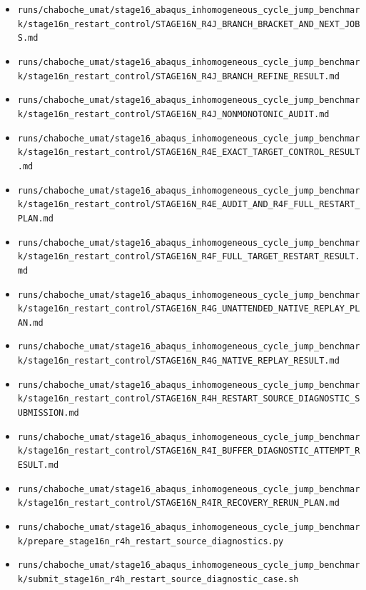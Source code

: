 \documentclass[11pt,a4paper]{article}
\newcommand{\code}[1]{\texttt{#1}}
\begin{document}
\begin{itemize}
  \item \code{runs/chaboche\_umat/stage16\_abaqus\_inhomogeneous\_cycle\_jump\_benchmark/stage16n\_restart\_control/STAGE16N\_R4J\_BRANCH\_BRACKET\_AND\_NEXT\_JOBS.md}
  \item \code{runs/chaboche\_umat/stage16\_abaqus\_inhomogeneous\_cycle\_jump\_benchmark/stage16n\_restart\_control/STAGE16N\_R4J\_BRANCH\_REFINE\_RESULT.md}
  \item \code{runs/chaboche\_umat/stage16\_abaqus\_inhomogeneous\_cycle\_jump\_benchmark/stage16n\_restart\_control/STAGE16N\_R4J\_NONMONOTONIC\_AUDIT.md}
  \item \code{runs/chaboche\_umat/stage16\_abaqus\_inhomogeneous\_cycle\_jump\_benchmark/stage16n\_restart\_control/STAGE16N\_R4E\_EXACT\_TARGET\_CONTROL\_RESULT.md}
  \item \code{runs/chaboche\_umat/stage16\_abaqus\_inhomogeneous\_cycle\_jump\_benchmark/stage16n\_restart\_control/STAGE16N\_R4E\_AUDIT\_AND\_R4F\_FULL\_RESTART\_PLAN.md}
  \item \code{runs/chaboche\_umat/stage16\_abaqus\_inhomogeneous\_cycle\_jump\_benchmark/stage16n\_restart\_control/STAGE16N\_R4F\_FULL\_TARGET\_RESTART\_RESULT.md}
  \item \code{runs/chaboche\_umat/stage16\_abaqus\_inhomogeneous\_cycle\_jump\_benchmark/stage16n\_restart\_control/STAGE16N\_R4G\_UNATTENDED\_NATIVE\_REPLAY\_PLAN.md}
  \item \code{runs/chaboche\_umat/stage16\_abaqus\_inhomogeneous\_cycle\_jump\_benchmark/stage16n\_restart\_control/STAGE16N\_R4G\_NATIVE\_REPLAY\_RESULT.md}
  \item \code{runs/chaboche\_umat/stage16\_abaqus\_inhomogeneous\_cycle\_jump\_benchmark/stage16n\_restart\_control/STAGE16N\_R4H\_RESTART\_SOURCE\_DIAGNOSTIC\_SUBMISSION.md}
  \item \code{runs/chaboche\_umat/stage16\_abaqus\_inhomogeneous\_cycle\_jump\_benchmark/stage16n\_restart\_control/STAGE16N\_R4I\_BUFFER\_DIAGNOSTIC\_ATTEMPT\_RESULT.md}
  \item \code{runs/chaboche\_umat/stage16\_abaqus\_inhomogeneous\_cycle\_jump\_benchmark/stage16n\_restart\_control/STAGE16N\_R4IR\_RECOVERY\_RERUN\_PLAN.md}
  \item \code{runs/chaboche\_umat/stage16\_abaqus\_inhomogeneous\_cycle\_jump\_benchmark/prepare\_stage16n\_r4h\_restart\_source\_diagnostics.py}
  \item \code{runs/chaboche\_umat/stage16\_abaqus\_inhomogeneous\_cycle\_jump\_benchmark/submit\_stage16n\_r4h\_restart\_source\_diagnostic\_case.sh}

\end{itemize}
\end{document}
